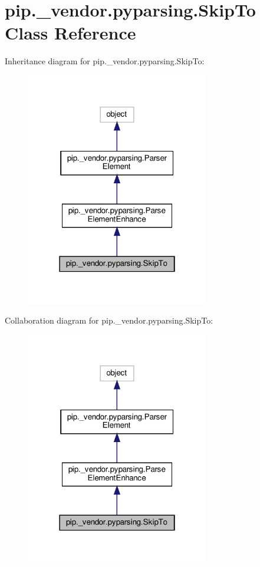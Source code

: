 \hypertarget{classpip_1_1__vendor_1_1pyparsing_1_1SkipTo}{}\section{pip.\+\_\+vendor.\+pyparsing.\+Skip\+To Class Reference}
\label{classpip_1_1__vendor_1_1pyparsing_1_1SkipTo}


Inheritance diagram for pip.\+\_\+vendor.\+pyparsing.\+Skip\+To\+:
\nopagebreak
\begin{figure}[H]
\begin{center}
\leavevmode
\includegraphics[width=226pt]{classpip_1_1__vendor_1_1pyparsing_1_1SkipTo__inherit__graph}
\end{center}
\end{figure}


Collaboration diagram for pip.\+\_\+vendor.\+pyparsing.\+Skip\+To\+:
\nopagebreak
\begin{figure}[H]
\begin{center}
\leavevmode
\includegraphics[width=226pt]{classpip_1_1__vendor_1_1pyparsing_1_1SkipTo__coll__graph}
\end{center}
\end{figure}
